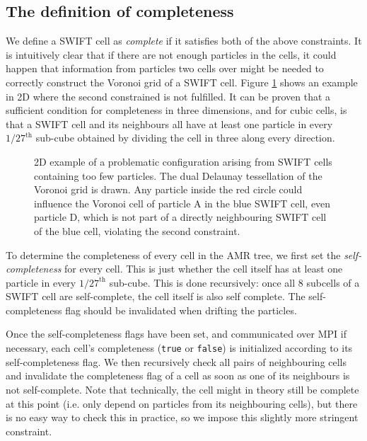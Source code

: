 \subsection{The definition of completeness}
We define a SWIFT cell as \emph{complete} if it satisfies both of the above constraints. 
It is intuitively clear that if there are not enough particles in the cells, it could happen that information from particles two cells over might be needed to correctly construct the Voronoi grid of a SWIFT cell. Figure \ref{fig:problem-completeness} shows an example in 2D where the second constrained is not fulfilled.
It can be proven that a sufficient condition for completeness in three dimensions, and for cubic cells, is that a SWIFT cell and its neighbours all have at least one particle in every $1/27^\text{th}$ sub-cube obtained by dividing the cell in three along every direction.

\begin{figure}
    \centering
    
    \caption{2D example of a problematic configuration arising from SWIFT cells containing too few particles. The dual Delaunay tessellation of the Voronoi grid is drawn. Any particle inside the red circle could influence the Voronoi cell of particle A in the blue SWIFT cell, even particle D, which is not part of a directly neighbouring SWIFT cell of the blue cell, violating the second constraint.}
    \label{fig:problem-completeness}
\end{figure}

To determine the completeness of every cell in the AMR tree, we first set the \emph{self-completeness} for every cell. This is just whether the cell itself has at least one particle in every $1/27^\text{th}$ sub-cube. This is done recursively: once all 8 subcells of a SWIFT cell are self-complete, the cell itself is also self complete.
The self-completeness flag should be invalidated when drifting the particles.

Once the self-completeness flags have been set, and communicated over MPI if necessary, each cell's completeness (\texttt{true} or \texttt{false}) is initialized according to its self-completeness flag. We then recursively check all pairs of neighbouring cells and invalidate the completeness flag of a cell as soon as one of its neighbours is not self-complete. Note that technically, the cell might in theory still be complete at this point (i.e. only depend on particles from its neighbouring cells), but there is no easy way to check this in practice, so we impose this slightly more stringent constraint.


